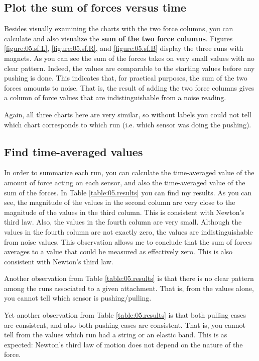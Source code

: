 \subsection{Plot the sum of forces versus time}
%
Besides visually examining the charts with the two force columns, you can calculate and also visualize the \textbf{sum of the two force columns}. Figures \ref{figure:05.sf.L}, \ref{figure:05.sf.R}, and \ref{figure:05.sf.B} display the three runs with magnets. As you can see the sum of the forces takes on very small values with no clear pattern. Indeed, the values are comparable to the starting values before any pushing is done. This indicates that, for practical purposes, the sum of the two forces amounts to noise. That is, the result of adding the two force columns gives a column of force values that are indistinguishable from a noise reading.

Again, all three charts here are very similar, so without labels you could not tell which chart corresponds to which run (i.e. which sensor was doing the pushing).
%
\subsection{Find time-averaged values}
%
In order to summarize each run, you can calculate the time-averaged value of the amount of force acting on each sensor, and also the time-averaged value of the sum of the forces. In Table \ref{table:05.results} you can find my results. As you can see, the magnitude of the values in the second column are very close to the magnitude of the values in the third column. This is consistent with Newton's third law. Also, the values in the fourth column are very small. Although the values in the fourth column are not exactly zero, the values are indistinguishable from noise values. This observation allows me to conclude that the sum of forces averages to a value that could be measured as effectively zero. This is also consistent with Newton's third law.

Another observation from Table \ref{table:05.results} is that there is no clear pattern among the runs associated to a given attachment. That is, from the values alone, you cannot tell which sensor is pushing/pulling.

Yet another observation from Table \ref{table:05.results} is that both pulling cases are consistent, and also both pushing cases are consistent. That is, you cannot tell from the values which run had a string or an elastic band. This is as expected: Newton's third law of motion does not depend on the nature of the force.
%
